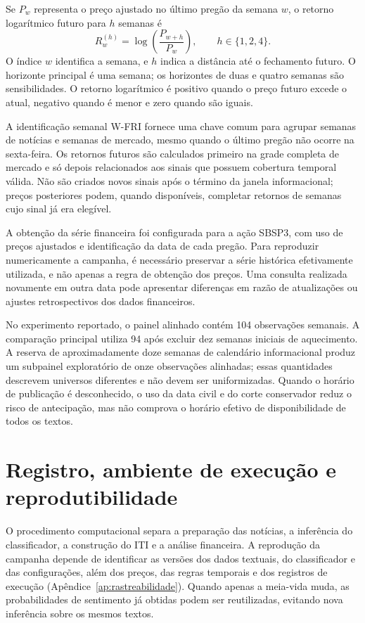 Se $P_w$ representa o preço ajustado no último pregão da semana $w$, o retorno logarítmico futuro para $h$ semanas é
\begin{equation}
    R_w^{(h)}=\log\left(\frac{P_{w+h}}{P_w}\right),\qquad h\in\{1,2,4\}.
    \label{eq:iti-retorno}
\end{equation}
O índice $w$ identifica a semana, e $h$ indica a distância até o fechamento futuro. O horizonte principal é uma semana; os horizontes de duas e quatro semanas são sensibilidades. O retorno logarítmico é positivo quando o preço futuro excede o atual, negativo quando é menor e zero quando são iguais.

A identificação semanal W-FRI fornece uma chave comum para agrupar semanas de notícias e semanas de mercado, mesmo quando o último pregão não ocorre na sexta-feira. Os retornos futuros são calculados primeiro na grade completa de mercado e só depois relacionados aos sinais que possuem cobertura temporal válida. Não são criados novos sinais após o término da janela informacional; preços posteriores podem, quando disponíveis, completar retornos de semanas cujo sinal já era elegível.

A obtenção da série financeira foi configurada para a ação SBSP3, com uso de preços ajustados e identificação da data de cada pregão. Para reproduzir numericamente a campanha, é necessário preservar a série histórica efetivamente utilizada, e não apenas a regra de obtenção dos preços. Uma consulta realizada novamente em outra data pode apresentar diferenças em razão de atualizações ou ajustes retrospectivos dos dados financeiros.

No experimento reportado, o painel alinhado contém 104 observações semanais. A comparação principal utiliza 94 após excluir dez semanas iniciais de aquecimento. A reserva de aproximadamente doze semanas de calendário informacional produz um subpainel exploratório de onze observações alinhadas; essas quantidades descrevem universos diferentes e não devem ser uniformizadas. Quando o horário de publicação é desconhecido, o uso da data civil e do corte conservador reduz o risco de antecipação, mas não comprova o horário efetivo de disponibilidade de todos os textos.

\section{Registro, ambiente de execução e reprodutibilidade}

O procedimento computacional separa a preparação das notícias, a inferência do classificador, a construção do ITI e a análise financeira. A reprodução da campanha depende de identificar as versões dos dados textuais, do classificador e das configurações, além dos preços, das regras temporais e dos registros de execução (Apêndice~\ref{ap:rastreabilidade}). Quando apenas a meia-vida muda, as probabilidades de sentimento já obtidas podem ser reutilizadas, evitando nova inferência sobre os mesmos textos.


